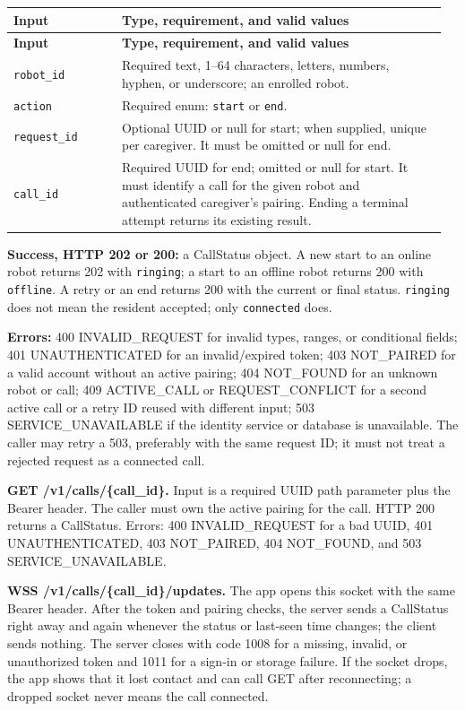 \documentclass[12pt,letterpaper]{article}
\newcommand{\field}[1]{\texttt{#1}}
\begin{document}
\begingroup\small
\begin{longtable}{@{}>{\RaggedRight\arraybackslash}p{0.24\linewidth}>{\RaggedRight\arraybackslash}p{0.72\linewidth}@{}}
\toprule\textbf{Input} & \textbf{Type, requirement, and valid values}\\\midrule\endfirsthead
\toprule\textbf{Input} & \textbf{Type, requirement, and valid values}\\\midrule\endhead
\midrule\endfoot\bottomrule\endlastfoot
\field{robot\_id} & Required text, 1--64 characters, letters, numbers, hyphen, or underscore; an enrolled robot. \\
\field{action} & Required enum: \field{start} or \field{end}. \\
\field{request\_id} & Optional UUID or null for start; when supplied, unique per caregiver. It must be omitted or null for end. \\
\field{call\_id} & Required UUID for end; omitted or null for start. It must identify a call for the given robot and authenticated caregiver's pairing. Ending a terminal attempt returns its existing result. \\
\end{longtable}
\endgroup

\textbf{Success, HTTP 202 or 200:} a CallStatus object. A new start to an online robot returns 202 with \field{ringing}; a start to an offline robot returns 200 with \field{offline}. A retry or an end returns 200 with the current or final status. \field{ringing} does not mean the resident accepted; only \field{connected} does.

\textbf{Errors:} 400 INVALID\_REQUEST for invalid types, ranges, or conditional fields; 401 UNAUTHENTICATED for an invalid/expired token; 403 NOT\_PAIRED for a valid account without an active pairing; 404 NOT\_FOUND for an unknown robot or call; 409 ACTIVE\_CALL or REQUEST\_CONFLICT for a second active call or a retry ID reused with different input; 503 SERVICE\_UNAVAILABLE if the identity service or database is unavailable. The caller may retry a 503, preferably with the same request ID; it must not treat a rejected request as a connected call.

\textbf{GET /v1/calls/\{call\_id\}.} Input is a required UUID path parameter plus the Bearer header. The caller must own the active pairing for the call. HTTP 200 returns a CallStatus. Errors: 400 INVALID\_REQUEST for a bad UUID, 401 UNAUTHENTICATED, 403 NOT\_PAIRED, 404 NOT\_FOUND, and 503 SERVICE\_UNAVAILABLE.

\textbf{WSS /v1/calls/\{call\_id\}/updates.} The app opens this socket with the same Bearer header. After the token and pairing checks, the server sends a CallStatus right away and again whenever the status or last-seen time changes; the client sends nothing. The server closes with code 1008 for a missing, invalid, or unauthorized token and 1011 for a sign-in or storage failure. If the socket drops, the app shows that it lost contact and can call GET after reconnecting; a dropped socket never means the call connected.
\end{document}
